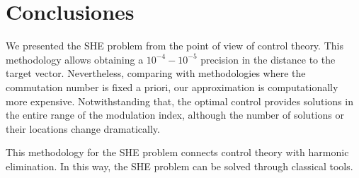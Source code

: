 \section{Conclusiones}\label{Section6}


We presented the SHE problem from the point of view of control theory. This methodology allows obtaining a $10^{-4}-10^{-5}$ precision in the distance to the target vector. Nevertheless, comparing with methodologies where the commutation number is fixed a priori, our approximation is computationally more expensive. Notwithstanding that, the optimal control provides solutions in the entire range of the modulation index, although the number of solutions or their locations change dramatically.

This methodology for the SHE problem connects control theory with harmonic elimination. In this way, the SHE problem can be solved through classical tools.



